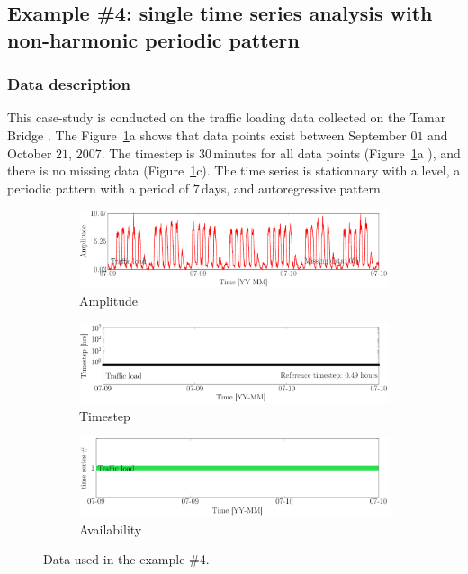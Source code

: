 \subsection{Example \#4: single time series analysis with non-harmonic periodic pattern}
\label{S:Example_TRAFFIC}
\subsubsection{Data description}

This case-study is conducted on the traffic loading data collected on the Tamar Bridge \citep{Goulet2017BDLMEmprical,Nguyen2019KRBDLM}. 
The Figure~\ref{fig:DataSummaryTraffic}a shows that data points exist between  September $01$ and October $21$, $2007$.
The timestep is $30$\,minutes for all data points (Figure~\ref{fig:DataSummaryTraffic}a ), and there is no missing data (Figure~\ref{fig:DataSummaryTraffic}c).
The time series is stationnary with a level, a periodic pattern with a period of $7$\,days, and autoregressive pattern.



\begin{figure}[h]
\centering
\begin{subfigure}{\linewidth}
\includegraphics[width=0.9\linewidth]{./docfigs/Example_TRAFFIC/raw/ALL_AMPLITUDES.pdf}
\caption{Amplitude}
\end{subfigure}
\begin{subfigure}{\linewidth}
\includegraphics[width=0.9\linewidth]{./docfigs/Example_TRAFFIC/raw/ALL_TIMESTEPS.pdf} 
\caption{Timestep}
\end{subfigure}
\begin{subfigure}{\linewidth}
\includegraphics[width=0.9\linewidth]{./docfigs/Example_TRAFFIC/raw/AVAILABILITY.pdf}
\caption{Availability}
\end{subfigure}
\caption{Data used in the example \#4.}
\label{fig:DataSummaryTraffic}
\end{figure}


